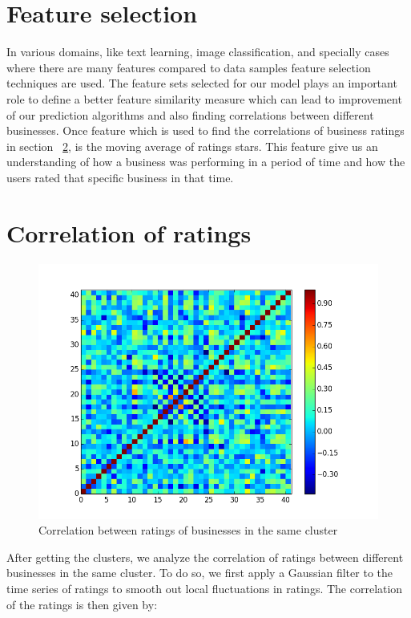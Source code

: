 \documentclass{vldb}
\begin{document}
\section{Feature selection}
In various domains, like text learning, image classification, and specially cases where there are many features compared to data samples feature selection techniques are used. The feature sets selected for our model plays an important role to define a better feature similarity measure which can lead to improvement of our prediction algorithms and also finding correlations between different businesses.
Once feature which is used to find the correlations of business ratings in section ~\ref{sec:correlation_of_ratings}, is the moving average of ratings stars. This feature give us an understanding of how a business was performing in a period of time and how the users rated that specific business in that time.


\section{Correlation of ratings}
\label{sec:correlation_of_ratings}
\begin{figure}
\centering
\includegraphics[width=\columnwidth]{cov_cluster_28}
\caption{Correlation between ratings of businesses in the same cluster}
\label{fig:correlation}
\end{figure}
After getting the clusters, we analyze the correlation of ratings between different businesses in the same cluster.
To do so, we first apply a Gaussian filter to the time series of ratings to smooth out local fluctuations in ratings. The correlation of the ratings is then given by:
\end{document}
